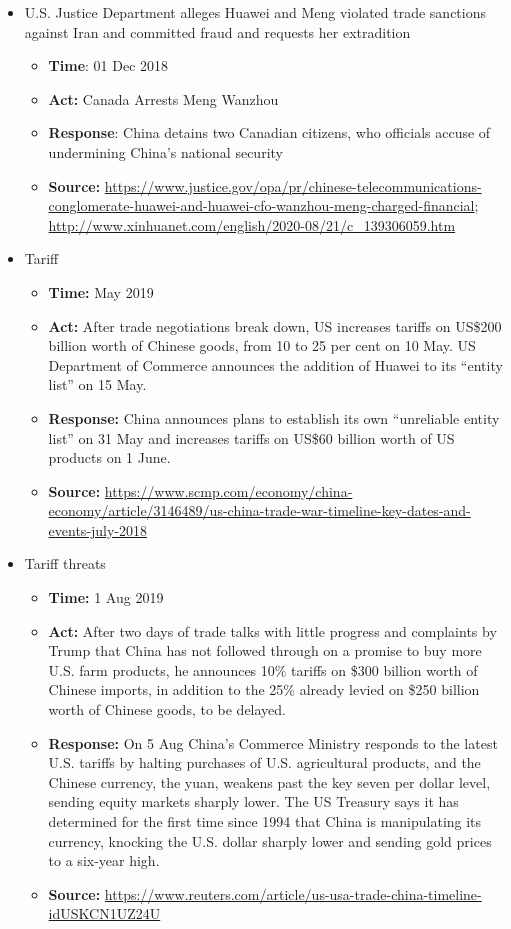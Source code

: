 \begin{itemize}
			\item U.S. Justice Department alleges Huawei and Meng violated trade sanctions against Iran and committed fraud and requests her extradition
				\begin{itemize}
				\item \textbf{Time}: 01 Dec 2018
				\item \textbf{Act:} Canada Arrests Meng Wanzhou
				\item \textbf{Response}: China detains two Canadian citizens, who officials accuse of undermining China’s national security
				\item	\textbf{Source:} \url{https://www.justice.gov/opa/pr/chinese-telecommunications-conglomerate-huawei-and-huawei-cfo-wanzhou-meng-charged-financial}; \url{http://www.xinhuanet.com/english/2020-08/21/c_139306059.htm}
				\end{itemize}
				
			\item Tariff
				\begin{itemize}
				\item \textbf{Time: }May 2019
				\item \textbf{Act: }After trade negotiations break down, US increases tariffs on US\$200 billion worth of Chinese goods, from 10 to 25 per cent on 10 May. US Department of Commerce announces the addition of Huawei to its “entity list” on 15 May.
				\item \textbf{Response: }China announces plans to establish its own “unreliable entity list” on 31 May and increases tariffs on US\$60 billion worth of US products on 1 June.
				\item	\textbf{Source: }\url{https://www.scmp.com/economy/china-economy/article/3146489/us-china-trade-war-timeline-key-dates-and-events-july-2018}
				\end{itemize}
			
			\item Tariff threats
				\begin{itemize}
				\item \textbf{Time: } 1 Aug 2019
				\item \textbf{Act: }After two days of trade talks with little progress and complaints by Trump that China has not followed through on a promise to buy more U.S. farm products, he announces 10\% tariffs on \$300 billion worth of Chinese imports, in addition to the 25\% already levied on \$250 billion worth of Chinese goods, to be delayed.
				\item \textbf{Response: } On 5 Aug China’s Commerce Ministry responds to the latest U.S. tariffs by halting purchases of U.S. agricultural products, and the Chinese currency, the yuan, weakens past the key seven per dollar level, sending equity markets sharply lower. The US Treasury says it has determined for the first time since 1994 that China is manipulating its currency, knocking the U.S. dollar sharply lower and sending gold prices to a six-year high.
				\item	\textbf{Source: }\url{https://www.reuters.com/article/us-usa-trade-china-timeline-idUSKCN1UZ24U}
				\end{itemize}
			

\end{itemize}
